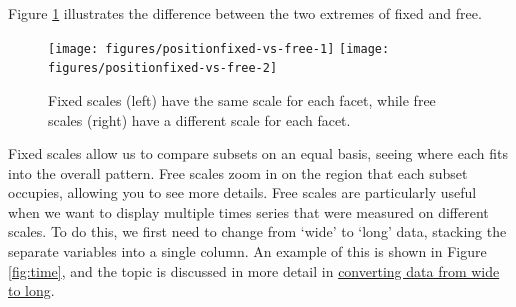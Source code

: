 Figure \ref{fig:fixed-vs-free} illustrates the difference between the
two extremes of fixed and free.

\begin{Shaded}
\begin{Highlighting}[]
\StringTok{ } 
\StringTok{ }\NormalTok{(~}\StringTok{ }
\StringTok{ }\NormalTok{(~}\StringTok{ } \NormalTok{)}
\end{Highlighting}
\end{Shaded}

\begin{figure}

{\centering \texttt{[image: figures/positionfixed-vs-free-1]} \texttt{[image: figures/positionfixed-vs-free-2]} 

}

\caption{Fixed scales (left) have the same scale for each facet, while free scales (right) have a different scale for each facet. \label{fig:fixed-vs-free}}
\end{figure}

Fixed scales allow us to compare subsets on an equal basis, seeing where
each fits into the overall pattern. Free scales zoom in on the region
that each subset occupies, allowing you to see more details. Free scales
are particularly useful when we want to display multiple times series
that were measured on different scales. To do this, we first need to
change from `wide' to `long' data, stacking the separate variables into
a single column. An example of this is shown in Figure \ref{fig:time},
and the topic is discussed in more detail in
\hyperref[sec:melting]{converting data from wide to long}.

\begin{Shaded}
\begin{Highlighting}[]
\StringTok{  }
  \NormalTok{, } \StringTok{ }
\StringTok{  }\StringTok{ } \NormalTok{)}
\end{Highlighting}
\end{Shaded}

